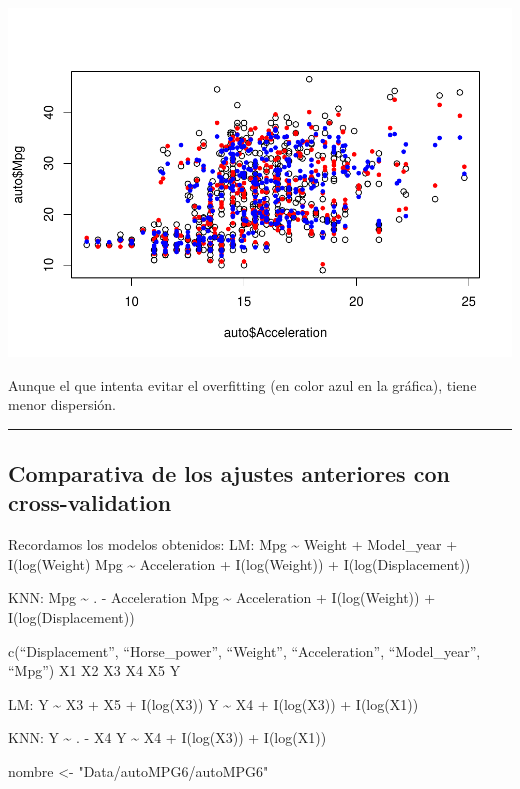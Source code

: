 \documentclass[
]{article}
\newenvironment{Shaded}{\begin{snugshade}}{\end{snugshade}}
\newcommand{\NormalTok}[1]{#1}
\newcommand{\StringTok}[1]{\textcolor[rgb]{0.31,0.60,0.02}{#1}}
\begin{document}
\begin{center}\includegraphics{Regresion_files/figure-latex/unnamed-chunk-33-2} \end{center}

Aunque el que intenta evitar el overfitting (en color azul en la
gráfica), tiene menor dispersión.

\begin{center}\rule{0.5\linewidth}{0.5pt}\end{center}

\hypertarget{comparativa-de-los-ajustes-anteriores-con-cross-validation}{%
\subsection{Comparativa de los ajustes anteriores con
cross-validation}\label{comparativa-de-los-ajustes-anteriores-con-cross-validation}}

Recordamos los modelos obtenidos: LM: Mpg \textasciitilde{} Weight +
Model\_year + I(log(Weight) Mpg \textasciitilde{} Acceleration +
I(log(Weight)) + I(log(Displacement))

KNN: Mpg \textasciitilde{} . - Acceleration Mpg \textasciitilde{}
Acceleration + I(log(Weight)) + I(log(Displacement))

c(``Displacement'', ``Horse\_power'', ``Weight'', ``Acceleration'',
``Model\_year'', ``Mpg'') X1 X2 X3 X4 X5 Y

LM: Y \textasciitilde{} X3 + X5 + I(log(X3)) Y \textasciitilde{} X4 +
I(log(X3)) + I(log(X1))

KNN: Y \textasciitilde{} . - X4 Y \textasciitilde{} X4 + I(log(X3)) +
I(log(X1))

\begin{Shaded}
\begin{Highlighting}[]
\NormalTok{nombre <-}\StringTok{ "Data/autoMPG6/autoMPG6"}
\end{Highlighting}
\end{Shaded}
\end{document}
